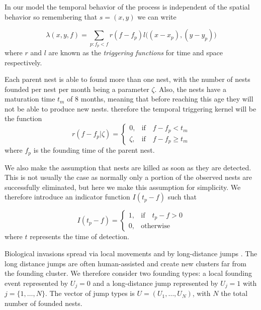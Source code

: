 \documentclass{article}
\begin{document}
In our model the temporal behavior of the process is independent of the spatial behavior so remembering that $s = (x, y)$ we can write

\begin{equation*}
    \lambda(x, y, f) = \sum_{ p: f_p < f } r(f-f_p) l\Big((x - x_p), (y - y_p)\Big)
\end{equation*}
where $r$ and $l$ are known as the {\em triggering functions} for time and space respectively.

Each parent nest is able to found more than one nest, with the number of nests founded per nest per month being a parameter $\zeta$. Also, the nests have a maturation time $t_m$ of 8 months, meaning that before reaching this age they will not be able to produce new nests. therefore the temporal triggering kernel will be the function
\begin{equation*}
    r (f - f_p | \zeta) =
    \begin{cases}
        0, & \mbox{if} \quad f - f_p < t_{m} \\
        \zeta, & \mbox{if} \quad f - f_p \geq t_{m}
    \end{cases}
\end{equation*}
where $f_p$ is the founding time of the parent nest.

We also make the assumption that nests are killed as soon as they are detected. This is not usually the case as normally only a portion of the observed nests are successfully eliminated, but here we make this assumption for simplicity. We therefore introduce an indicator function $I(t_p - f)$ such that

\begin{equation*}
    I (t_p - f) =
    \begin{cases}
        1, & \mbox{if} \quad t_p -  f > 0 \\
        0, & \mbox{otherwise}
    \end{cases}
\end{equation*}
where $t$ represents the time of detection.

Biological invasions spread via local movements and by long-distance jumps \cite{Suarez}. The long distance jumps are often human-assisted and create new clusters far from the founding cluster. We therefore consider two founding types: a local founding event represented by $U_j = 0$ and a long-distance jump represented by $U_j = 1$ with $j = \{1, \dots, N\}$. The vector of jump types is $U = (U_1, \dots, U_N)$, with $N$ the total number of founded nests.
\end{document}
